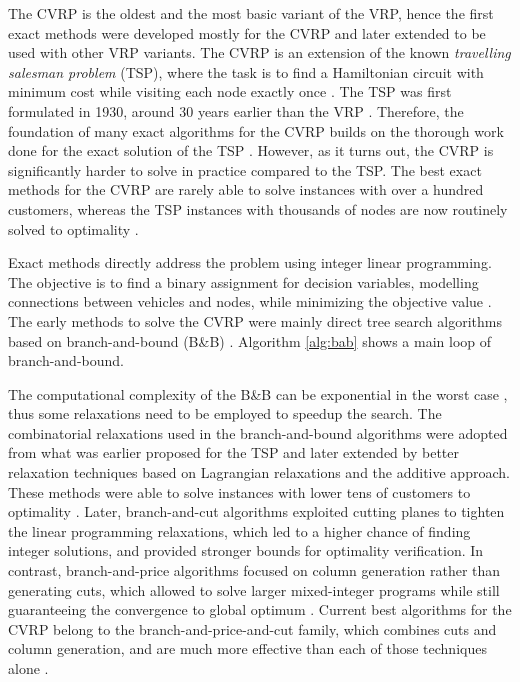 The CVRP is the oldest and the most basic variant of the VRP, hence the first exact methods were developed mostly for the CVRP and later extended to be used with other VRP variants. The CVRP is an extension of the known \emph{travelling salesman problem} (TSP), where the task is to find a Hamiltonian circuit with minimum cost while visiting each node exactly once \cite{toth2015vrp}. The TSP was first formulated in 1930, around 30 years earlier than the VRP \cite{tspsurvey, 1959}. Therefore, the foundation of many exact algorithms for the CVRP builds on the thorough work done for the exact solution of the TSP \cite{toth2015vrp}. However, as it turns out, the CVRP is significantly harder to solve in practice compared to the TSP. The best exact methods for the CVRP are rarely able to solve instances with over a hundred customers, whereas the TSP instances with thousands of nodes are now routinely solved to optimality \cite{2007-cordeau}.

Exact methods directly address the problem using integer linear programming. The objective is to find a binary assignment for decision variables, modelling connections between vehicles and nodes, while minimizing the objective value \cite{Bono2020}. The early methods to solve the CVRP were mainly direct tree search algorithms based on branch-and-bound (B\&B) \cite{toth2015vrp}. Algorithm \ref{alg:bab} shows a main loop of branch-and-bound.

The computational complexity of the B\&B can be exponential in the worst case \cite{darp-survey}, thus some relaxations need to be employed to speedup the search. The combinatorial relaxations used in the branch-and-bound algorithms were adopted from what was earlier proposed for the TSP \cite{tspalg} and later extended by better relaxation techniques based on Lagrangian relaxations and the additive approach. These methods were able to solve instances with lower tens of customers to optimality \cite{toth2015vrp}. Later, branch-and-cut algorithms exploited cutting planes to tighten the linear programming relaxations, which led to a higher chance of finding integer solutions, and provided stronger bounds for optimality verification. In contrast, branch-and-price algorithms focused on column generation rather than generating cuts, which allowed to solve larger mixed-integer programs while still guaranteeing the convergence to global optimum \cite{toth2015vrp, darp-survey}. Current best algorithms for the CVRP belong to the branch-and-price-and-cut family, which combines cuts and column generation, and are much more effective than each of those techniques alone \cite{Fukasawa2006}.


